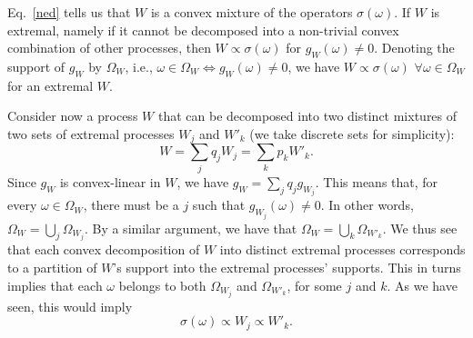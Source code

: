 \documentclass[a4paper,onecolumn,11pt,accepted=2018-05-04]{quantumarticle}
\begin{document}
Eq.~\eqref{ned} tells us that $W$ is a convex mixture of the operators $\sigma(\omega)$. If $W$ is extremal, namely if it cannot be decomposed into a non-trivial convex combination of other processes, then $W \propto \sigma(\omega)$ for $g_W(\omega) \neq 0$. Denoting the support of $g_W$ by $\Omega_W$, i.e., $\omega\in \Omega_W \Leftrightarrow g_W(\omega) \neq 0$, we have $W \propto \sigma(\omega)$ $\forall \omega \in \Omega_W$ for an extremal $W$.

Consider now a process $W$ that can be decomposed into two distinct mixtures of two sets of extremal processes $W_j$ and $W'_k$ (we take discrete sets for simplicity):
\begin{equation} 
W= \sum_j q_j W_j = \sum_k p_kW'_k.
\end{equation}
Since $g_W$ is convex-linear in $W$, we have $g_W= \sum_j q_j g_{W_j}$.
This means that, for every $\omega \in \Omega_W$, there must be a $j$ such that $g_{W_j}(\omega) \neq 0$. In other words, $\Omega_W=\bigcup_j \Omega_{W_j}$. By a similar argument, we have that $\Omega_W=\bigcup_k \Omega_{W'_k}$. We thus see that each convex decomposition of $W$ into distinct extremal processes corresponds to a partition of $W$'s support into the extremal processes' supports. This in turns implies that each $\omega$ belongs to both $\Omega_{W_j}$ and $\Omega_{W'_k}$, for some $j$ and $k$. As we have seen, this would imply
\begin{equation}\label{prop}
\sigma(\omega)\propto W_j \propto W'_k.
\end{equation}
\end{document}
